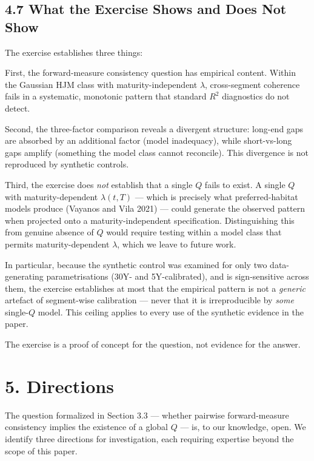 \documentclass[
]{article}
\begin{document}
\subsection{4.7 What the Exercise Shows and Does Not
Show}\label{what-the-exercise-shows-and-does-not-show}

The exercise establishes three things:

First, the forward-measure consistency question has empirical content.
Within the Gaussian HJM class with maturity-independent \(\lambda\),
cross-segment coherence fails in a systematic, monotonic pattern that
standard \(R^2\) diagnostics do not detect.

Second, the three-factor comparison reveals a divergent structure:
long-end gaps are absorbed by an additional factor (model inadequacy),
while short-vs-long gaps amplify (something the model class cannot
reconcile). This divergence is not reproduced by synthetic controls.

Third, the exercise does \emph{not} establish that a single \(Q\) fails
to exist. A single \(Q\) with maturity-dependent \(\lambda(t,T)\) ---
which is precisely what preferred-habitat models produce (Vayanos and
Vila 2021) --- could generate the observed pattern when projected onto a
maturity-independent specification. Distinguishing this from genuine
absence of \(Q\) would require testing within a model class that permits
maturity-dependent \(\lambda\), which we leave to future work.

In particular, because the synthetic control was examined for only two
data-generating parametrisations (30Y- and 5Y-calibrated), and is
sign-sensitive across them, the exercise establishes at most that the
empirical pattern is not a \emph{generic} artefact of segment-wise
calibration --- never that it is irreproducible by \emph{some}
single-\(Q\) model. This ceiling applies to every use of the synthetic
evidence in the paper.

The exercise is a proof of concept for the question, not evidence for
the answer.

\section{5. Directions}\label{directions}

The question formalized in Section 3.3 --- whether pairwise
forward-measure consistency implies the existence of a global \(Q\) ---
is, to our knowledge, open. We identify three directions for
investigation, each requiring expertise beyond the scope of this paper.
\end{document}
